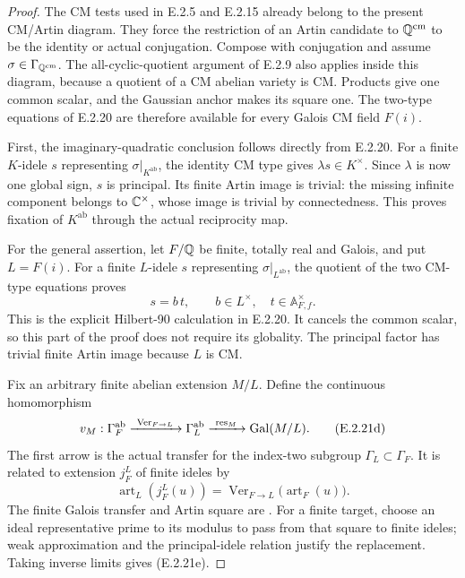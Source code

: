 \begin{proof}
The CM tests used in E.2.5 and E.2.15 already belong
to the present CM/Artin diagram. They force the
restriction of an Artin candidate to
\(\mathbb Q^{\mathrm{cm}}\) to be the identity or actual
conjugation. Compose with conjugation and assume
\(\sigma\in\Gamma_{\mathbb Q^{\mathrm{cm}}}\).
The all-cyclic-quotient argument of E.2.9 also applies
inside this diagram, because a quotient of a CM
abelian variety is CM. Products give one common
scalar, and the Gaussian anchor makes its square
one. The two-type equations of E.2.20 are therefore
available for every Galois CM field \(F(i)\).

First, the imaginary-quadratic conclusion follows
directly from E.2.20. For a finite \(K\)-idele \(s\)
representing \(\sigma|_{K^{\mathrm{ab}}}\), the
identity CM type gives
\(\lambda s\in K^\times\). Since \(\lambda\) is now
one global sign, \(s\) is principal. Its finite
Artin image is trivial: the missing infinite
component belongs to \(\mathbb C^\times\), whose image
is trivial by connectedness. This proves fixation
of \(K^{\mathrm{ab}}\) through the actual reciprocity
map.

For the general assertion, let \(F/\mathbb Q\) be finite,
totally real and Galois, and put \(L=F(i)\).
For a finite \(L\)-idele \(s\) representing
\(\sigma|_{L^{\mathrm{ab}}}\), the quotient of the
two CM-type equations proves
\[
 s=b\,t,\qquad b\in L^\times,\quad
 t\in\mathbb A_{F,f}^{\times}.
 \tag{E.2.21c}
\]
This is the explicit Hilbert-90 calculation in
E.2.20. It cancels the common scalar, so this
part of the proof does not require its globality.
The principal factor has trivial finite Artin
image because \(L\) is CM.

Fix an arbitrary finite abelian extension \(M/L\).
Define the continuous homomorphism
\[
 v_M:\Gamma_F^{\mathrm{ab}}
   \xrightarrow{\ \operatorname{Ver}_{F\to L}\ }
   \Gamma_L^{\mathrm{ab}}
   \xrightarrow{\ \operatorname{res}_M\ }
   \operatorname{Gal}(M/L).
 \tag{E.2.21d}
\]
The first arrow is the actual transfer for the
index-two subgroup \(\Gamma_L\subset\Gamma_F\).
It is related to extension \(j_F^L\) of finite
ideles by
\[
 \operatorname{art}_L(j_F^L(u))
  =\operatorname{Ver}_{F\to L}
       \bigl(\operatorname{art}_F(u)\bigr).
 \tag{E.2.21e}
\]
The finite Galois transfer and Artin square are
\cite[Chapter V, Proposition 3.18 and adjoining
diagram, p.~162]{GenMilneCFT2020}.
For a finite target, choose an ideal representative
prime to its modulus to pass from that square to
finite ideles; weak approximation and the
principal-idele relation justify the replacement.
Taking inverse limits gives (E.2.21e).


\end{proof}
